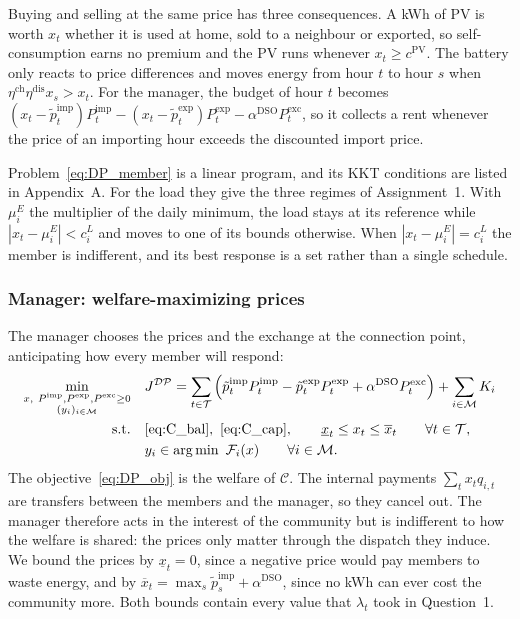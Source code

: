 Buying and selling at the same price has three consequences.
A kWh of PV is worth $x_t$ whether it is used at home, sold to a neighbour or exported, so self-consumption earns no premium and the PV runs whenever $x_t\geq c^{\mathrm{PV}}$.
The battery only reacts to price differences and moves energy from hour $t$ to hour $s$ when $\eta^{\mathrm{ch}}\eta^{\mathrm{dis}}x_s>x_t$.
For the manager, the budget of hour $t$ becomes $(x_t-\tilde{p}^{\mathrm{imp}}_t)P^{\mathrm{imp}}_t-(x_t-\tilde{p}^{\mathrm{exp}}_t)P^{\mathrm{exp}}_t-\alpha^{\mathrm{DSO}}P^{\mathrm{exc}}_t$, so it collects a rent whenever the price of an importing hour exceeds the discounted import price.

Problem~\eqref{eq:DP_member} is a linear program, and its KKT conditions are listed in Appendix~A.
For the load they give the three regimes of Assignment~1.
With $\mu^E_i$ the multiplier of the daily minimum, the load stays at its reference while $|x_t-\mu^E_i|<c^L_i$ and moves to one of its bounds otherwise.
When $|x_t-\mu^E_i|=c^L_i$ the member is indifferent, and its best response is a set rather than a single schedule.

\subsubsection{Manager: welfare-maximizing prices}
The manager chooses the prices and the exchange at the connection point, anticipating how every member will respond:
\begin{subequations}\label{eq:DP}
\begin{align}
\min_{\substack{x,\ P^{\mathrm{imp}},P^{\mathrm{exp}},P^{\mathrm{exc}}\geq 0\\ (y_i)_{i\in\mathcal{M}}}}\quad & J^{\mathcal{DP}}=\sum_{t\in\mathcal{T}}\Big(\tilde{p}^{\mathrm{imp}}_tP^{\mathrm{imp}}_t-\tilde{p}^{\mathrm{exp}}_tP^{\mathrm{exp}}_t+\alpha^{\mathrm{DSO}}P^{\mathrm{exc}}_t\Big)+\sum_{i\in\mathcal{M}}K_i \label{eq:DP_obj}\\
\text{s.t.}\quad & \eqref{eq:C_bal},\ \eqref{eq:C_cap}, \qquad \underline{x}_t\leq x_t\leq\overline{x}_t \qquad \forall t\in\mathcal{T}, \label{eq:DP_upper}\\
& y_i\in\arg\min\ \mathcal{F}_i(x) \qquad \forall i\in\mathcal{M}. \label{eq:DP_lower}
\end{align}
\end{subequations}
The objective~\eqref{eq:DP_obj} is the welfare of $\mathcal{C}$.
The internal payments $\sum_tx_tq_{i,t}$ are transfers between the members and the manager, so they cancel out.
The manager therefore acts in the interest of the community but is indifferent to how the welfare is shared: the prices only matter through the dispatch they induce.
We bound the prices by $\underline{x}_t=0$, since a negative price would pay members to waste energy, and by $\overline{x}_t=\max_s\tilde{p}^{\mathrm{imp}}_s+\alpha^{\mathrm{DSO}}$, since no kWh can ever cost the community more.
Both bounds contain every value that $\lambda_t$ took in Question~1.

